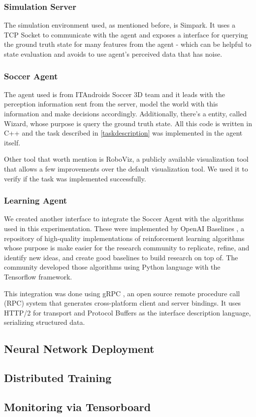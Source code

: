 \subsubsection{Simulation Server}

The simulation environment used, as mentioned before, is Simpark. It uses a TCP Socket to communicate with the agent and exposes a interface for querying the ground truth state for many features from the agent - which can be helpful to state evaluation and avoids to use agent's perceived data that has noise. 

\subsubsection{Soccer Agent}
The agent used is from ITAndroids Soccer 3D team and it leads with the perception information sent from the server, model the world with this information and make decisions accordingly. Additionally, there's a entity, called Wizard, whose purpose is query the ground truth state. All this code is written in C++ and the task described in \ref{taskdescription} was implemented in the agent itself.

Other tool that worth mention is RoboViz, a publicly available visualization tool that allows a few improvements over the default visualization tool. We used it to verify if the task was implemented successfully.

\subsubsection{Learning Agent}

We created another interface to integrate the Soccer Agent with the algorithms used in this experimentation. These were implemented by OpenAI Baselines \cite{baselines}, a repository of high-quality implementations of reinforcement learning algorithms whose purpose is make easier for the research community to replicate, refine, and identify new ideas, and create good baselines to build research on top of. The community developed those algorithms using Python language with the Tensorflow \cite{tensorflow2015-whitepaper} framework.

This integration was done using gRPC \cite{grpc}, an open source remote procedure call (RPC) system that generates cross-platform client and server bindings. It uses HTTP/2 for transport and Protocol Buffers \cite{protocolbuffers} as the interface description language, serializing structured data.




\subsection{Neural Network Deployment}

\subsection{Distributed Training}

\subsection{Monitoring via Tensorboard}